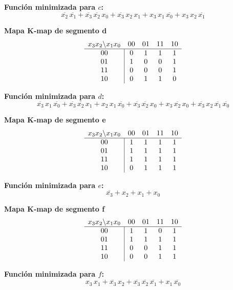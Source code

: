 \documentclass[12pt]{article}
\begin{document}
\noindent
\textbf{Función minimizada para \(c\):}
\[
\overline{x_2}\,\overline{x_1} + \overline{x_3}\,\overline{x_2}\,x_0 + \overline{x_3}\,x_2\,x_1 + x_3\,x_1\,\overline{x_0} + x_3\,x_2\,\overline{x_1}
\]

\noindent
\textbf{Mapa K‐map de segmento \textsf{d}}  
\[
\begin{array}{c|cccc}
\multicolumn{1}{c}{x_3x_2 \backslash x_1x_0} & 00 & 01 & 11 & 10 \\
\hline
00 & 0 & 1 & 1 & 1 \\
01 & 1 & 0 & 0 & 1 \\
11 & 0 & 0 & 0 & 1 \\
10 & 0 & 1 & 1 & 0 \\
\end{array}
\]
\vspace{1em}

\noindent
\textbf{Función minimizada para \(d\):}
\[
\overline{x_3}\,x_1\,\overline{x_0} + \overline{x_3}\,\overline{x_2}\,x_1 + x_2\,x_1\,\overline{x_0} + \overline{x_3}\,\overline{x_2}\,x_0 + x_3\,\overline{x_2}\,x_0 + \overline{x_3}\,x_2\,\overline{x_1}\,\overline{x_0}
\]

\noindent
\textbf{Mapa K‐map de segmento \textsf{e}}  
\[
\begin{array}{c|cccc}
\multicolumn{1}{c}{x_3x_2 \backslash x_1x_0} & 00 & 01 & 11 & 10 \\
\hline
00 & 1 & 1 & 1 & 1 \\
01 & 1 & 1 & 1 & 1 \\
11 & 1 & 1 & 1 & 1 \\
10 & 0 & 1 & 1 & 1 \\
\end{array}
\]
\vspace{1em}

\noindent
\textbf{Función minimizada para \(e\):}
\[
\overline{x_3} + x_2 + x_1 + x_0
\]

\noindent
\textbf{Mapa K‐map de segmento \textsf{f}}  
\[
\begin{array}{c|cccc}
\multicolumn{1}{c}{x_3x_2 \backslash x_1x_0} & 00 & 01 & 11 & 10 \\
\hline
00 & 1 & 1 & 0 & 1 \\
01 & 1 & 1 & 1 & 1 \\
11 & 0 & 0 & 1 & 1 \\
10 & 0 & 0 & 1 & 1 \\
\end{array}
\]
\vspace{1em}

\noindent
\textbf{Función minimizada para \(f\):}
\[
x_3\,x_1 + \overline{x_3}\,x_2 + \overline{x_3}\,\overline{x_2}\,\overline{x_1} + x_1\,\overline{x_0}
\]
\end{document}
